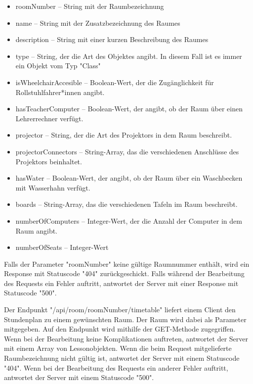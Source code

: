 \begin{itemize}
    \item roomNumber -- String mit der Raumbezeichnung
    \item name -- String mit der Zusatzbezeichnung des Raumes
    \item description -- String mit einer kurzen Beschreibung des Raumes
    \item type -- String, der die Art des Objektes angibt. In diesem Fall ist es immer ein Objekt vom Typ "Class"
    \item isWheelchairAccesible -- Boolean-Wert, der die Zugänglichkeit für Rollstuhlfahrer*innen angibt.
    \item hasTeacherComputer -- Boolean-Wert, der angibt, ob der Raum über einen Lehrerrechner verfügt.
    \item projector -- String, der die Art des Projektors in dem Raum beschreibt.
    \item projectorConnectors -- String-Array, das die verschiedenen Anschlüsse des Projektors beinhaltet.
    \item hasWater -- Boolean-Wert, der angibt, ob der Raum über ein Waschbecken mit Wasserhahn verfügt. 
    \item boards -- String-Array, das die verschiedenen Tafeln im Raum beschreibt.
    \item numberOfComputers -- Integer-Wert, der die Anzahl der Computer in dem Raum angibt.
    \item numberOfSeats -- Integer-Wert  
\end{itemize}

Falls der Parameter "roomNumber" keine gültige Raumnummer enthält, wird ein Response mit Statuscode "404" zurückgeschickt. 
Falls während der Bearbeitung des Requests ein Fehler auftritt, antwortet der Server mit einer Response mit Statuscode "500".


Der Endpunkt "/api/room/{roomNumber}/timetable" liefert einem Client den Stundenplan zu einem gewünschten Raum. Der Raum wird dabei als Parameter mitgegeben. Auf den Endpunkt wird mithilfe der GET-Methode zugegriffen. Wenn bei der Bearbeitung keine Komplikationen auftreten, antwortet der Server mit einem Array von Lessonobjekten. Wenn die beim Request mitgelieferte Raumbezeichnung nicht gültig ist, antwortet der Server mit einem Statuscode "404". Wenn bei der Bearbeitung des Requests ein anderer Fehler auftritt, antwortet der Server mit einem Statuscode "500".

